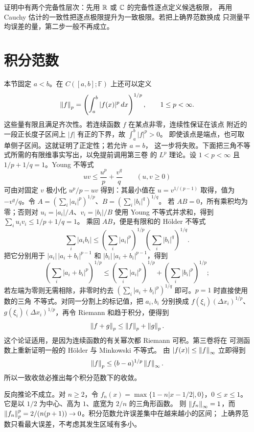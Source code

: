证明中有两个完备性层次：先用 $\mathbb{R}$ 或 $\mathbb{C}$ 的完备性逐点定义候选极限，
再用 Cauchy 估计的一致性把逐点极限提升为一致极限。若把上确界范数换成
只测量平均误差的量，第二步一般不再成立。

\section{积分范数}

本节固定 $a<b$。在 $C([a,b];\mathbb F)$ 上还可以定义
\[
 \left\lVert f\right\rVert_p=\left(\int_a^b|f(x)|^p\,dx\right)^{1/p},\qquad 1\le p<\infty.
\]
这些量有限且满足齐次性。若连续函数 $f$ 在某点非零，连续性保证在该点
附近的一段正长度子区间上 $|f|$ 有正的下界，故 $\int_a^b|f|^p>0$。
即使该点是端点，也可取单侧子区间。这就证明了正定性；若允许 $a=b$，
这一步将失败。下面把三角不等式所需的有限维事实写出，以免提前调用第三卷
的 \(L^p\) 理论。设 \(1<p<\infty\) 且 \(1/p+1/q=1\)。Young 不等式
\[
 uv\le \frac{u^p}{p}+\frac{v^q}{q}\qquad(u,v\ge0)
\]
可由对固定 $v$ 极小化 $u^p/p-uv$ 得到：其最小值在
$u=v^{1/(p-1)}$ 取得，值为 $-v^q/q$。令
$A=(\sum_i|a_i|^p)^{1/p}$、$B=(\sum_i|b_i|^q)^{1/q}$。
若 $AB=0$，所有乘积均为零；否则对 $u_i=|a_i|/A$、$v_i=|b_i|/B$
使用 Young 不等式并求和，得到 $\sum_i u_iv_i\le1/p+1/q=1$。
乘回 $AB$，便是有限和的 Hölder 不等式
\[
 \sum_i|a_ib_i|
 \le\left(\sum_i|a_i|^p\right)^{1/p}
    \left(\sum_i|b_i|^q\right)^{1/q}.
\]
把它分别用于
\(|a_i|\,|a_i+b_i|^{p-1}\) 和
\(|b_i|\,|a_i+b_i|^{p-1}\)，得到
\[
 \left(\sum_i|a_i+b_i|^p\right)^{1/p}
 \le
 \left(\sum_i|a_i|^p\right)^{1/p}
 +\left(\sum_i|b_i|^p\right)^{1/p};
\]
若左端为零则无需相除，非零时约去
\((\sum_i|a_i+b_i|^p)^{1/q}\) 即可。\(p=1\) 时直接使用数的三角
不等式。对同一分割上的标记值，把 \(a_i,b_i\) 分别换成
\(f(\xi_i)(\Delta x_i)^{1/p}\)、
\(g(\xi_i)(\Delta x_i)^{1/p}\)，再令 Riemann 和趋于积分，便得到
\[
 \left\lVert f+g\right\rVert_p\le\left\lVert f\right\rVert_p+\left\lVert g\right\rVert_p.
\]
这个论证适用，是因为连续函数的有关幂次都 Riemann 可积。第三卷将在
可测函数上重新证明一般的 Hölder 与 Minkowski 不等式。
由 $|f(x)|\le\left\lVert f\right\rVert_\infty$ 立即得到
\begin{equation}
 \left\lVert f\right\rVert_p\le(b-a)^{1/p}\left\lVert f\right\rVert_\infty.
 \label{eq:sup-controls-integral-norm}
\end{equation}
所以一致收敛必推出每个积分范数下的收敛。

反向推论不成立。对 $n\ge2$，令
$f_n(x)=\max\{1-n|x-1/2|,0\}$，$0\le x\le1$。
它是以 $1/2$ 为中心、高为 $1$、底宽为 $2/n$ 的三角形函数。
则 $\left\lVert f_n\right\rVert_\infty=1$，而
$\left\lVert f_n\right\rVert_p^p=2/(n(p+1))\to0$。积分范数允许误差集中在越来越小的区间；
上确界范数只看最大误差，不考虑其发生区域有多小。

